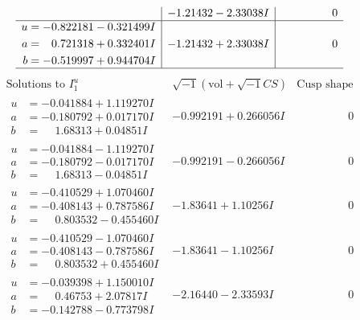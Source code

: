 \documentclass[1p]{elsarticle_modified}
\theoremstyle{definition}
\newcommand{\I}{\sqrt{-1}}
\begin{document}
$$\begin{array}{c|c|c}
 & -1.21432 - 2.33038 I & \phantom{-0.000000 } 0 \\ \hline\begin{aligned}
u &= -0.822181 - 0.321499 I \\
a &= \phantom{-}0.721318 + 0.332401 I \\
b &= -0.519997 + 0.944704 I\end{aligned}
 & -1.21432 + 2.33038 I & \phantom{-0.000000 } 0\\
 \hline 
 \end{array}$$\newpage$$\begin{array}{c|c|c}  
\text{Solutions to }I^u_{1}& \I (\text{vol} + \sqrt{-1}CS) & \text{Cusp shape}\\
 \hline 
\begin{aligned}
u &= -0.041884 + 1.119270 I \\
a &= -0.180792 + 0.017170 I \\
b &= \phantom{-}1.68313 + 0.04851 I\end{aligned}
 & -0.992191 + 0.266056 I & \phantom{-0.000000 } 0 \\ \hline\begin{aligned}
u &= -0.041884 - 1.119270 I \\
a &= -0.180792 - 0.017170 I \\
b &= \phantom{-}1.68313 - 0.04851 I\end{aligned}
 & -0.992191 - 0.266056 I & \phantom{-0.000000 } 0 \\ \hline\begin{aligned}
u &= -0.410529 + 1.070460 I \\
a &= -0.408143 + 0.787586 I \\
b &= \phantom{-}0.803532 - 0.455460 I\end{aligned}
 & -1.83641 + 1.10256 I & \phantom{-0.000000 } 0 \\ \hline\begin{aligned}
u &= -0.410529 - 1.070460 I \\
a &= -0.408143 - 0.787586 I \\
b &= \phantom{-}0.803532 + 0.455460 I\end{aligned}
 & -1.83641 - 1.10256 I & \phantom{-0.000000 } 0 \\ \hline\begin{aligned}
u &= -0.039398 + 1.150010 I \\
a &= \phantom{-}0.46753 + 2.07817 I \\
b &= -0.142788 - 0.773798 I\end{aligned}
 & -2.16440 - 2.33593 I & \phantom{-0.000000 } 0 \\ \hline\begin{aligned}

\end{aligned}
\end{array}$$
\end{document}

